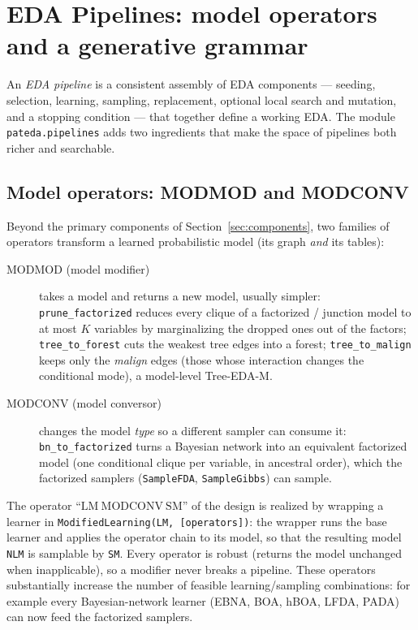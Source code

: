 \documentclass[a4paper,11pt]{article}
\begin{document}
\section{EDA Pipelines: model operators and a generative grammar}
\label{sec:pipelines}

An \emph{EDA pipeline} is a consistent assembly of EDA components --- seeding, selection, learning, sampling, replacement, optional local search and mutation, and a stopping condition --- that together define a working EDA.  The module \texttt{pateda.pipelines} adds two ingredients that make the space of pipelines both richer and searchable.

\subsection{Model operators: MODMOD and MODCONV}

Beyond the primary components of Section~\ref{sec:components}, two families of operators transform a learned probabilistic model (its graph \emph{and} its tables):

\begin{description}
  \item[MODMOD (model modifier)] takes a model and returns a new model, usually simpler:
    \texttt{prune\_factorized} reduces every clique of a factorized / junction model to at most $K$ variables by marginalizing the dropped ones out of the factors;
    \texttt{tree\_to\_forest} cuts the weakest tree edges into a forest;
    \texttt{tree\_to\_malign} keeps only the \emph{malign} edges (those whose interaction changes the conditional mode), a model-level Tree-EDA-M.
  \item[MODCONV (model conversor)] changes the model \emph{type} so a different sampler can consume it:
    \texttt{bn\_to\_factorized} turns a Bayesian network into an equivalent factorized model (one conditional clique per variable, in ancestral order), which the factorized samplers (\texttt{SampleFDA}, \texttt{SampleGibbs}) can sample.
\end{description}

The operator ``$\mathrm{LM}\ \mathrm{MODCONV}\ \mathrm{SM}$'' of the design is realized by wrapping a learner in \texttt{ModifiedLearning(LM, [operators])}: the wrapper runs the base learner and applies the operator chain to its model, so that the resulting model \texttt{NLM} is samplable by \texttt{SM}.  Every operator is robust (returns the model unchanged when inapplicable), so a modifier never breaks a pipeline.  These operators substantially increase the number of feasible learning/sampling combinations: for example every Bayesian-network learner (EBNA, BOA, hBOA, LFDA, PADA) can now feed the factorized samplers.
\end{document}
